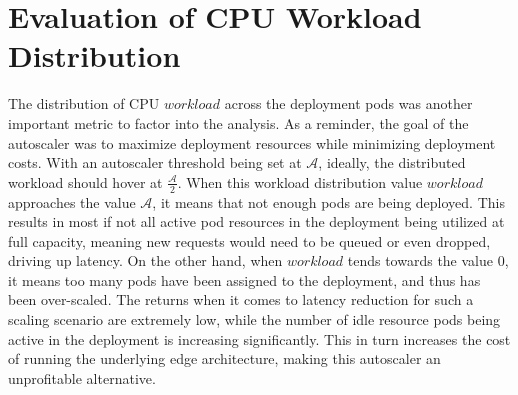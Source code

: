 \section{Evaluation of CPU Workload Distribution}
\label{sec:ch6-cpu-workload-eval}

The distribution of CPU $workload$ across the deployment pods was another important metric to factor into the analysis. As a reminder, the goal of the autoscaler was to maximize deployment resources while minimizing deployment costs. With an autoscaler threshold being set at $\mathcal{A}$, ideally, the distributed workload should hover at $\frac{\mathcal{A}}{2}$. When this workload distribution value $workload$ approaches the value $\mathcal{A}$, it means that not enough pods are being deployed. This results in most if not all active pod resources in the deployment being utilized at full capacity, meaning new requests would need to be queued or even dropped, driving up latency. On the other hand, when $workload$ tends towards the value $0$, it means too many pods have been assigned to the deployment, and thus has been over-scaled. The returns when it comes to latency reduction for such a scaling scenario are extremely low, while the number of idle resource pods being active in the deployment is increasing significantly. This in turn increases the cost of running the underlying edge architecture, making this autoscaler an unprofitable alternative.\par

